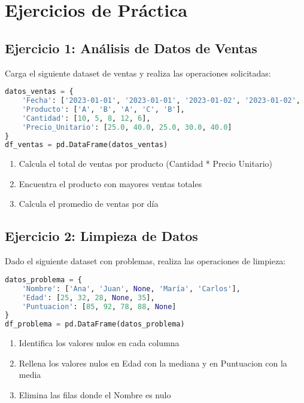 \documentclass[a4paper,12pt]{article}
\begin{document}
\section{Ejercicios de Práctica}

\subsection{Ejercicio 1: Análisis de Datos de Ventas}
Carga el siguiente dataset de ventas y realiza las operaciones solicitadas:

\begin{lstlisting}[language=Python]
datos_ventas = {
    'Fecha': ['2023-01-01', '2023-01-01', '2023-01-02', '2023-01-02', '2023-01-03'],
    'Producto': ['A', 'B', 'A', 'C', 'B'],
    'Cantidad': [10, 5, 8, 12, 6],
    'Precio_Unitario': [25.0, 40.0, 25.0, 30.0, 40.0]
}
df_ventas = pd.DataFrame(datos_ventas)
\end{lstlisting}

\begin{enumerate}
    \item Calcula el total de ventas por producto (Cantidad * Precio Unitario)
    \item Encuentra el producto con mayores ventas totales
    \item Calcula el promedio de ventas por día
\end{enumerate}

\subsection{Ejercicio 2: Limpieza de Datos}
Dado el siguiente dataset con problemas, realiza las operaciones de limpieza:

\begin{lstlisting}[language=Python]
datos_problema = {
    'Nombre': ['Ana', 'Juan', None, 'María', 'Carlos'],
    'Edad': [25, 32, 28, None, 35],
    'Puntuacion': [85, 92, 78, 88, None]
}
df_problema = pd.DataFrame(datos_problema)
\end{lstlisting}

\begin{enumerate}
    \item Identifica los valores nulos en cada columna
    \item Rellena los valores nulos en Edad con la mediana y en Puntuacion con la media
    \item Elimina las filas donde el Nombre es nulo
\end{enumerate}
\end{document}
